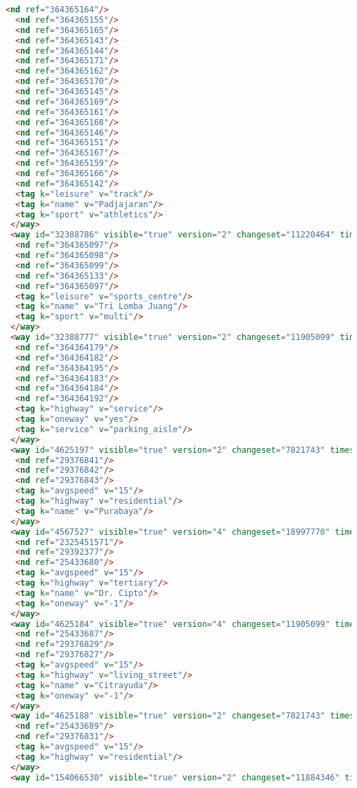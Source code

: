 \begin{lstlisting}[language=HTML,basicstyle=\tiny,caption=test.xml]
  <nd ref="364365164"/>
  <nd ref="364365155"/>
  <nd ref="364365165"/>
  <nd ref="364365143"/>
  <nd ref="364365144"/>
  <nd ref="364365171"/>
  <nd ref="364365162"/>
  <nd ref="364365170"/>
  <nd ref="364365145"/>
  <nd ref="364365169"/>
  <nd ref="364365161"/>
  <nd ref="364365168"/>
  <nd ref="364365146"/>
  <nd ref="364365151"/>
  <nd ref="364365167"/>
  <nd ref="364365159"/>
  <nd ref="364365166"/>
  <nd ref="364365142"/>
  <tag k="leisure" v="track"/>
  <tag k="name" v="Padjajaran"/>
  <tag k="sport" v="athletics"/>
 </way>
 <way id="32388786" visible="true" version="2" changeset="11220464" timestamp="2012-04-08T02:49:11Z" user="andryono" uid="643030">
  <nd ref="364365097"/>
  <nd ref="364365098"/>
  <nd ref="364365099"/>
  <nd ref="364365133"/>
  <nd ref="364365097"/>
  <tag k="leisure" v="sports_centre"/>
  <tag k="name" v="Tri Lomba Juang"/>
  <tag k="sport" v="multi"/>
 </way>
 <way id="32388777" visible="true" version="2" changeset="11905099" timestamp="2012-06-15T14:05:59Z" user="andryono" uid="643030">
  <nd ref="364364179"/>
  <nd ref="364364182"/>
  <nd ref="364364195"/>
  <nd ref="364364183"/>
  <nd ref="364364184"/>
  <nd ref="364364192"/>
  <tag k="highway" v="service"/>
  <tag k="oneway" v="yes"/>
  <tag k="service" v="parking_aisle"/>
 </way>
 <way id="4625197" visible="true" version="2" changeset="7821743" timestamp="2011-04-10T11:14:24Z" user="evo2mind" uid="234610">
  <nd ref="29376841"/>
  <nd ref="29376842"/>
  <nd ref="29376843"/>
  <tag k="avgspeed" v="15"/>
  <tag k="highway" v="residential"/>
  <tag k="name" v="Purabaya"/>
 </way>
 <way id="4567527" visible="true" version="4" changeset="18997770" timestamp="2013-11-19T17:08:37Z" user="ubanovic" uid="1784103">
  <nd ref="2325451571"/>
  <nd ref="29392377"/>
  <nd ref="25433680"/>
  <tag k="avgspeed" v="15"/>
  <tag k="highway" v="tertiary"/>
  <tag k="name" v="Dr. Cipto"/>
  <tag k="oneway" v="-1"/>
 </way>
 <way id="4625184" visible="true" version="4" changeset="11905099" timestamp="2012-06-15T14:05:58Z" user="andryono" uid="643030">
  <nd ref="25433687"/>
  <nd ref="29376829"/>
  <nd ref="29376827"/>
  <tag k="avgspeed" v="15"/>
  <tag k="highway" v="living_street"/>
  <tag k="name" v="Citrayuda"/>
  <tag k="oneway" v="-1"/>
 </way>
 <way id="4625188" visible="true" version="2" changeset="7821743" timestamp="2011-04-10T11:12:21Z" user="evo2mind" uid="234610">
  <nd ref="25433689"/>
  <nd ref="29376831"/>
  <tag k="avgspeed" v="15"/>
  <tag k="highway" v="residential"/>
 </way>
 <way id="154066530" visible="true" version="2" changeset="11884346" timestamp="2012-06-13T12:22:04Z" user="andryono" uid="643030">

\end{lstlisting}
